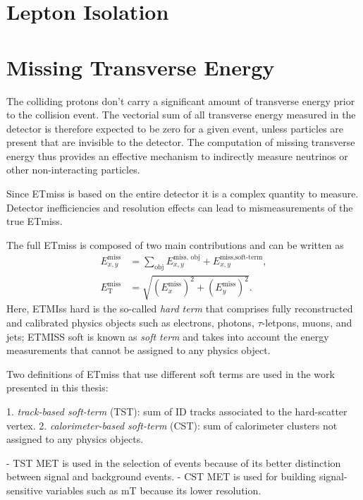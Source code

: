 \section{Lepton Isolation}



\section{Missing Transverse Energy}
\cite{PERF-2016-07}

The colliding protons don't carry a significant amount of transverse energy prior to the collision event.
The vectorial sum of all transverse energy measured in the detector is therefore expected to be zero for a given event, unless particles are present that are invisible to the detector. The computation of missing transverse energy thus provides an effective mechanism to indirectly measure neutrinos or other non-interacting particles. 

Since ETmiss is based on the entire detector it is a complex quantity to measure. 
Detector inefficiencies and resolution effects can lead to mismeasurements of the true ETmiss.

The full ETmiss is composed of two main contributions and can be written as
\begin{align}
    E_{x,y}^\text{miss} &= \sum_{\text{obj}} E_{x,y}^\text{miss, obj} + E_{x,y}^\text{miss,soft-term}, \\
    E_{\text{T}}^\text{miss} &= \sqrt{ \left( E_x^{\text{miss}} \right)^2 + \left(  E_y^{\text{miss}}\right)^2 }.
    \label{eq:met}
  \end{align}
Here, ETMIss hard is the so-called \emph{hard term} that comprises fully reconstructed and calibrated physics objects such as electrons, photons, $\tau$-letpons, muons, and jets; ETMISS soft is known as \emph{soft term} and takes into account the energy measurements that cannot be assigned to any physics object.

Two definitions of ETmiss that use different soft terms are used in the work presented in this thesis:

1. \emph{track-based soft-term} (TST): sum of ID tracks associated to the hard-scatter vertex.
2. \emph{calorimeter-based soft-term} (CST): sum of calorimeter clusters not assigned to any physics objects.

- TST MET is used in the selection of events because of its better distinction between signal and background events. 
- CST MET is used for building signal-sensitive variables such as mT because its lower resolution.


